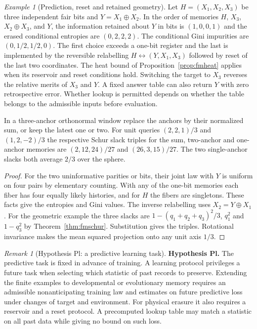 \documentclass[aps,pra,onecolumn,superscriptaddress,nofootinbib,10pt]{revtex4-2}
\theoremstyle{definition}
\theoremstyle{remark}
\newtheorem{remark}[theorem]{Remark}
\newtheorem{example}[theorem]{Example}
\begin{document}
\begin{example}[Prediction, reset and retained geometry]\label{ob:memoryexample}
Let $H=(X_1,X_2,X_3)$ be three independent fair bits and
$Y=X_1\oplus X_2$. In the order of memories
$H$, $X_3$, $X_2\oplus X_3$, and $Y$, the information retained about
$Y$ in bits is $(1,0,0,1)$ and the erased conditional entropies are
$(0,2,2,2)$. The conditional Gini impurities are $(0,1/2,1/2,0)$.
The first choice exceeds a one-bit register and the last is implemented
by the reversible relabelling $H\leftrightarrow (Y,X_1,X_3)$ followed
by reset of the last two coordinates. The heat bound of
Proposition~\ref{prop:fmheat} applies when its reservoir and reset
conditions hold. Switching the target to $X_3$ reverses the
relative merits of $X_3$ and $Y$. A fixed answer table can also
return $Y$ with zero retrospective error. Whether lookup is
permitted depends on whether the table belongs to the admissible
inputs before evaluation.

In a three-anchor orthonormal window replace the anchors by their
normalized sum, or keep the latest one or two. For unit queries
$(2,2,1)/3$ and $(1,2,-2)/3$ the respective Schur slack triples
for the sum, two-anchor and one-anchor memories are
$(2,12,24)/27$ and $(26,3,15)/27$. The two single-anchor slacks
both average $2/3$ over the sphere.
\end{example}
\begin{proof}
For the two uninformative parities or bits, their joint law with
$Y$ is uniform on four pairs by elementary counting. With any
of the one-bit memories each fiber has four equally likely
histories, and for $H$ the fibers are singletons. These facts give
the entropies and Gini values. The inverse relabelling uses
$X_2=Y\oplus X_1$. For the geometric example the three slacks
are $1-(q_1+q_2+q_3)^2/3$, $q_1^2$ and $1-q_3^2$ by
Theorem~\ref{thm:fmschur}. Substitution gives the triples.
Rotational invariance makes the mean squared projection
onto any unit axis $1/3$.
\end{proof}

\begin{remark}[Hypothesis Pl: a predictive learning task]\label{ob:learninghypothesis}
\textbf{Hypothesis Pl.}\label{hyp:Pl}  The predictive task is fixed in advance of training.  A learning protocol privileges a future task when selecting which
statistic of past records to preserve. Extending the finite examples
to developmental or evolutionary memory requires an admissible
nonanticipating training law and estimates on future predictive loss
under changes of target and environment. For physical erasure it also
requires a reservoir and a reset protocol. A precomputed lookup table may
match a statistic on all past data while giving no bound on such loss.
\end{remark}
\end{document}

